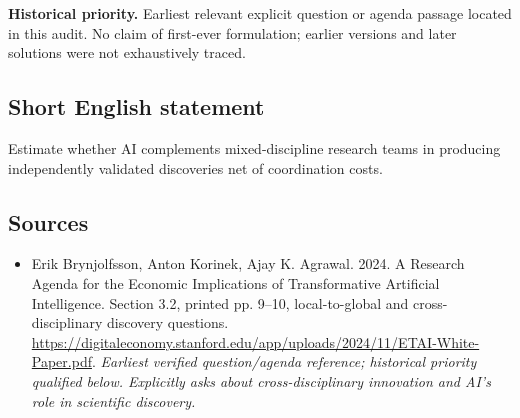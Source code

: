 \documentclass[11pt]{article}
\begin{document}
\par\textbf{Historical priority.} Earliest relevant explicit question or agenda passage located in this audit. No claim of first-ever formulation; earlier versions and later solutions were not exhaustively traced.

\subsection{Short English statement}
Estimate whether AI complements mixed-discipline research teams in producing independently validated discoveries net of coordination costs.

\subsection{Sources}
\begin{itemize}\raggedright
\item[\textnormal{[S1]}]\hypertarget{source:30007693:1}{} Erik Brynjolfsson, Anton Korinek, Ajay K. Agrawal. 2024. A Research Agenda for the Economic Implications of Transformative Artificial Intelligence. Section 3.2, printed pp. 9–10, local-to-global and cross-disciplinary discovery questions.
\url{https://digitaleconomy.stanford.edu/app/uploads/2024/11/ETAI-White-Paper.pdf}.
{\small\textit{Earliest verified question/agenda reference; historical priority qualified below. Explicitly asks about cross-disciplinary innovation and AI's role in scientific discovery.}}
\end{itemize}
\end{document}
